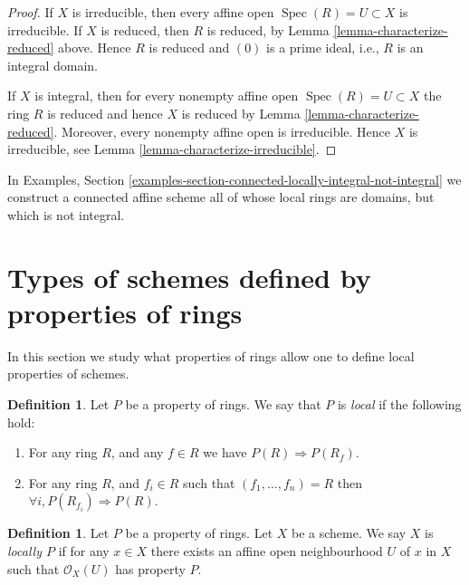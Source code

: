 \documentclass{stacks-project}
\theoremstyle{plain}
\theoremstyle{definition}
\newtheorem{definition}[subsection]{Definition}
\theoremstyle{remark}
\numberwithin{equation}{subsection}
\def\Spec{\mathop{\mathrm{Spec}}}
\begin{document}
\begin{proof}
If $X$ is irreducible, then every affine open $\Spec(R) = U \subset X$
is irreducible. If $X$ is reduced, then $R$ is reduced, by
Lemma \ref{lemma-characterize-reduced} above. Hence $R$ is reduced
and $(0)$ is a prime ideal, i.e., $R$ is an integral domain.

\medskip\noindent
If $X$ is integral, then for every nonempty affine open
$\Spec(R) = U \subset X$ the ring $R$ is reduced
and hence $X$ is reduced by Lemma \ref{lemma-characterize-reduced}.
Moreover, every nonempty affine open is irreducible.
Hence $X$ is irreducible, see Lemma \ref{lemma-characterize-irreducible}.
\end{proof}

\noindent
In Examples, Section
\ref{examples-section-connected-locally-integral-not-integral}
we construct a connected affine scheme all of whose local rings are domains,
but which is not integral.











\section{Types of schemes defined by properties of rings}
\label{section-properties-rings}

\noindent
In this section we study what properties of rings
allow one to define local properties of schemes.

\begin{definition}
\label{definition-property-local}
Let $P$ be a property of rings.
We say that $P$ is {\it local} if the following hold:
\begin{enumerate}
\item For any ring $R$, and any $f \in R$ we have
$P(R) \Rightarrow P(R_f)$.
\item For any ring $R$, and $f_i \in R$ such that
$(f_1, \ldots, f_n) = R$ then
$\forall i, P(R_{f_i}) \Rightarrow P(R)$.
\end{enumerate}
\end{definition}

\begin{definition}
\label{definition-locally-P}
Let $P$ be a property of rings. Let $X$ be a scheme.
We say $X$ is {\it locally $P$} if for any $x \in X$
there exists an affine open neighbourhood $U$ of $x$
in $X$ such that $\mathcal{O}_X(U)$ has property $P$.
\end{definition}
\end{document}
